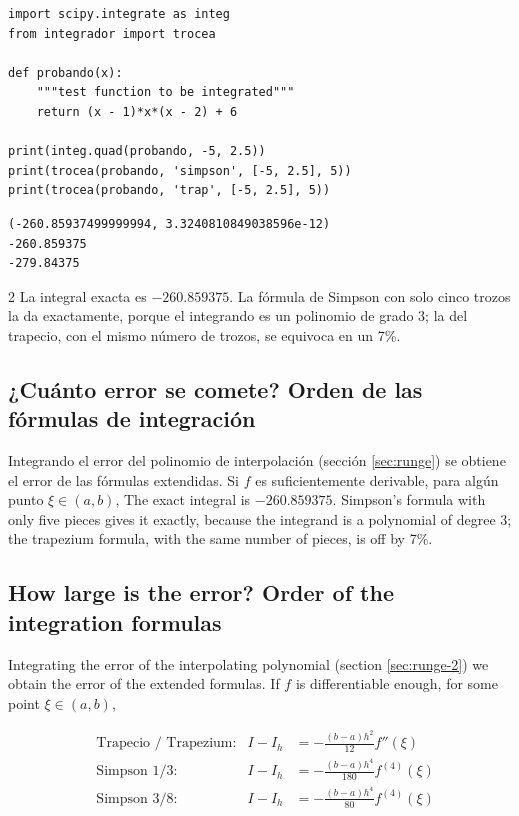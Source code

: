 \begin{verbatim}
import scipy.integrate as integ
from integrador import trocea

def probando(x):
    """test function to be integrated"""
    return (x - 1)*x*(x - 2) + 6

print(integ.quad(probando, -5, 2.5))
print(trocea(probando, 'simpson', [-5, 2.5], 5))
print(trocea(probando, 'trap', [-5, 2.5], 5))
\end{verbatim}
\begin{verbatim}
(-260.85937499999994, 3.3240810849038596e-12)
-260.859375
-279.84375
\end{verbatim}
\begin{paracol}{2}
La integral exacta es $-260.859375$. La fórmula de Simpson con solo cinco trozos la da exactamente, porque el integrando es un polinomio de grado 3; la del trapecio, con el mismo número de trozos, se equivoca en un 7\%.

\subsection{¿Cuánto error se comete? Orden de las fórmulas de integración}\label{sec:error_integracion}
Integrando el error del polinomio de interpolación (sección \ref{sec:runge}) se obtiene el error de las fórmulas extendidas. Si $f$ es suficientemente derivable, para algún punto $\xi\in(a,b)$,
\switchcolumn
The exact integral is $-260.859375$. Simpson's formula with only five pieces gives it exactly, because the integrand is a polynomial of degree 3; the trapezium formula, with the same number of pieces, is off by 7\%.

\subsection{How large is the error? Order of the integration formulas}\label{sec:error_integracion-2}
Integrating the error of the interpolating polynomial (section \ref{sec:runge-2}) we obtain the error of the extended formulas. If $f$ is differentiable enough, for some point $\xi\in(a,b)$,
\end{paracol}
\begin{align*}
&\text{Trapecio / Trapezium:} & I-I_h&=-\frac{(b-a)h^2}{12}f''(\xi)\\
&\text{Simpson 1/3:} & I-I_h&=-\frac{(b-a)h^4}{180}f^{(4)}(\xi)\\
&\text{Simpson 3/8:} & I-I_h&=-\frac{(b-a)h^4}{80}f^{(4)}(\xi)
\end{align*}
